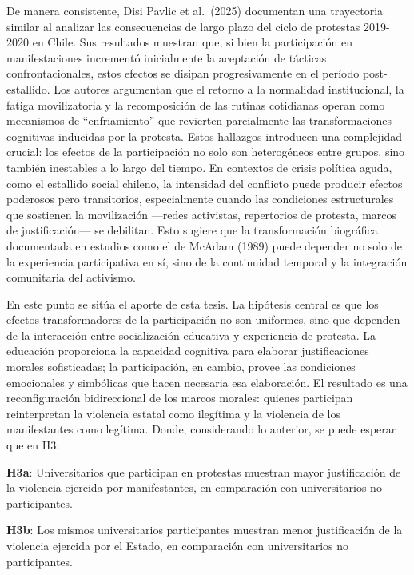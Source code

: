 \documentclass[
  13pt,
]{article}
\begin{document}
De manera consistente, Disi Pavlic et al.~(2025) documentan una
trayectoria similar al analizar las consecuencias de largo plazo del
ciclo de protestas 2019-2020 en Chile. Sus resultados muestran que, si
bien la participación en manifestaciones incrementó inicialmente la
aceptación de tácticas confrontacionales, estos efectos se disipan
progresivamente en el período post-estallido. Los autores argumentan que
el retorno a la normalidad institucional, la fatiga movilizatoria y la
recomposición de las rutinas cotidianas operan como mecanismos de
``enfriamiento'' que revierten parcialmente las transformaciones
cognitivas inducidas por la protesta. Estos hallazgos introducen una
complejidad crucial: los efectos de la participación no solo son
heterogéneos entre grupos, sino también inestables a lo largo del
tiempo. En contextos de crisis política aguda, como el estallido social
chileno, la intensidad del conflicto puede producir efectos poderosos
pero transitorios, especialmente cuando las condiciones estructurales
que sostienen la movilización ---redes activistas, repertorios de
protesta, marcos de justificación--- se debilitan. Esto sugiere que la
transformación biográfica documentada en estudios como el de McAdam
(1989) puede depender no solo de la experiencia participativa en sí,
sino de la continuidad temporal y la integración comunitaria del
activismo.

En este punto se sitúa el aporte de esta tesis. La hipótesis central es
que los efectos transformadores de la participación no son uniformes,
sino que dependen de la interacción entre socialización educativa y
experiencia de protesta. La educación proporciona la capacidad cognitiva
para elaborar justificaciones morales sofisticadas; la participación, en
cambio, provee las condiciones emocionales y simbólicas que hacen
necesaria esa elaboración. El resultado es una reconfiguración
bidireccional de los marcos morales: quienes participan reinterpretan la
violencia estatal como ilegítima y la violencia de los manifestantes
como legítima. Donde, considerando lo anterior, se puede esperar que en
H3:

\textbf{H3a}: Universitarios que participan en protestas muestran mayor
justificación de la violencia ejercida por manifestantes, en comparación
con universitarios no participantes.

\textbf{H3b}: Los mismos universitarios participantes muestran menor
justificación de la violencia ejercida por el Estado, en comparación con
universitarios no participantes.
\end{document}
